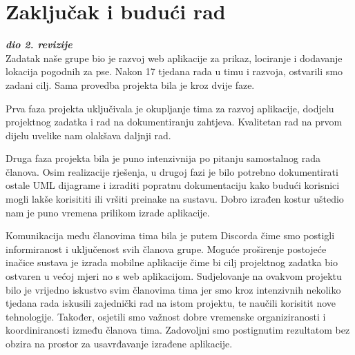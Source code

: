 \chapter{Zaključak i budući rad}
		\textbf{\textit{dio 2. revizije}}\\
		
		

        Zadatak naše grupe bio je razvoj web aplikacije za prikaz, lociranje i dodavanje lokacija pogodnih za pse. Nakon 17 tjedana rada u timu i razvoja, ostvarili smo zadani cilj. Sama provedba projekta bila je kroz dvije faze.

        Prva faza projekta uključivala je okupljanje tima za razvoj aplikacije, dodjelu projektnog zadatka i rad na dokumentiranju zahtjeva. Kvalitetan rad na prvom dijelu uvelike nam olakšava daljnji rad. 
        
        Druga faza projekta bila je puno intenzivnija po pitanju samostalnog rada članova. Osim realizacije rješenja, u drugoj fazi je bilo potrebno dokumentirati ostale UML dijagrame i izraditi popratnu dokumentaciju kako budući korisnici mogli lakše korisititi ili vršiti preinake na sustavu. Dobro izrađen kostur uštedio nam je puno vremena prilikom izrade aplikacije.
        
        Komunikacija među članovima tima bila je putem Discorda čime smo postigli informiranost i uključenost svih članova grupe. Moguće proširenje postojeće inačice sustava je izrada mobilne aplikacije čime bi cilj projektnog zadatka bio ostvaren u većoj mjeri no s web aplikacijom.
        Sudjelovanje na ovakvom projektu bilo je vrijedno iskustvo svim članovima tima jer smo kroz intenzivnih nekoliko tjedana rada iskusili zajednički rad na istom projektu, te naučili korisitit nove tehnologije. Također, osjetili smo važnost dobre vremenske organiziranosti i koordiniranosti između članova tima. Zadovoljni smo postignutim rezultatom bez obzira na prostor za usavrđavanje izrađene aplikacije.
		
		\eject 